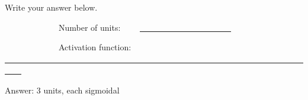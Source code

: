 \documentclass[11pt]{report}
\begin{document}
\begin{enumerate}
\vspace{0.1in}

Write your answer below.
\vspace{0.2in}

~~~~~~~~~~~~~Number of units: ~~~~\underline{~~~~~~~~~~~~~~~~~~~~~~}

\vspace{0.3in}

~~~~~~~~~~~~~Activation function: \underline{~~~~~~~~~~~~~~~~~~~~~~~~~~~~~~~~~~~~~~~~~~~~~~~~~~~~~~~~~~~~~~~~~~~~~~~~~~~~}
\begin{mdframed}
Answer:  3 units, each sigmoidal
\end{mdframed}
\end{enumerate}
\end{document}
